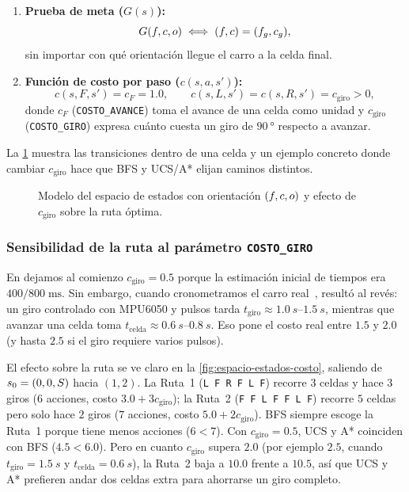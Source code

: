 \begin{definicion}
\begin{enumerate}[leftmargin=1.6em,itemsep=3pt]
  \item \textbf{Prueba de meta ($G(s)$):}
  \[
    G(f,c,o) \iff (f, c) = (f_g, c_g),
  \]
  sin importar con qué orientación llegue el carro a la celda final.

  \item \textbf{Función de costo por paso ($c(s, a, s')$):}
  \[
    c(s, F, s') = c_F = 1.0, \qquad c(s, L, s') = c(s, R, s') = c_{\text{giro}} > 0,
  \]
  donde $c_F$ (\texttt{COSTO\_AVANCE}) toma el avance de una celda como unidad y $c_{\text{giro}}$ (\texttt{COSTO\_GIRO}) expresa cuánto cuesta un giro de $\SI{90}{\degree}$ respecto a avanzar.
\end{enumerate}
\end{definicion}

La \cref{fig:espacio-estados} muestra las transiciones dentro de una celda y un ejemplo concreto donde cambiar $c_{\text{giro}}$ hace que BFS y UCS/A* elijan caminos distintos.

\begin{figure}[H]
  \centering
  
  \caption{Modelo del espacio de estados con orientación $(f,c,o)$ y efecto de $c_{\text{giro}}$ sobre la ruta óptima.}
  \label{fig:espacio-estados}
\end{figure}

\subsubsection{Sensibilidad de la ruta al parámetro \texttt{COSTO\_GIRO}}

En  dejamos al comienzo $c_{\text{giro}} = 0.5$ porque la estimación inicial de tiempos era $400/800\;\si{\milli\second}$. Sin embargo, cuando cronometramos el carro real~\cite{handoff2026doc}, resultó al revés: un giro controlado con MPU6050 y pulsos tarda $t_{\text{giro}} \approx \SIrange{1.0}{1.5}{s}$, mientras que avanzar una celda toma $t_{\text{celda}} \approx \SIrange{0.6}{0.8}{s}$. Eso pone el costo real entre $1.5$ y $2.0$ (y hasta $2.5$ si el giro requiere varios pulsos).

El efecto sobre la ruta se ve claro en la \cref{fig:espacio-estados-costo}, saliendo de $s_0 = (0,0,S)$ hacia $(1, 2)$. La Ruta~1 (\texttt{L F R F L F}) recorre $3$ celdas y hace $3$ giros ($6$ acciones, costo $3.0 + 3 c_{\text{giro}}$); la Ruta~2 (\texttt{F F L F F L F}) recorre $5$ celdas pero solo hace $2$ giros ($7$ acciones, costo $5.0 + 2 c_{\text{giro}}$). BFS siempre escoge la Ruta~1 porque tiene menos acciones ($6 < 7$). Con $c_{\text{giro}} = 0.5$, UCS y A* coinciden con BFS ($4.5 < 6.0$). Pero en cuanto $c_{\text{giro}}$ supera $2.0$ (por ejemplo $2.5$, cuando $t_{\text{giro}} = \SI{1.5}{s}$ y $t_{\text{celda}} = \SI{0.6}{s}$), la Ruta~2 baja a $10.0$ frente a $10.5$, así que UCS y A* prefieren andar dos celdas extra para ahorrarse un giro completo.

